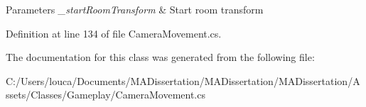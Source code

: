 \begin{DoxyParams}{Parameters}
{\em \+\_\+start\+Room\+Transform} & Start room transform\\
\hline
\end{DoxyParams}


Definition at line 134 of file Camera\+Movement.\+cs.



The documentation for this class was generated from the following file\+:\begin{DoxyCompactItemize}
\item 
C\+:/\+Users/louca/\+Documents/\+M\+A\+Dissertation/\+M\+A\+Dissertation/\+M\+A\+Dissertation/\+Assets/\+Classes/\+Gameplay/Camera\+Movement.\+cs\end{DoxyCompactItemize}
